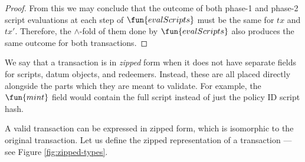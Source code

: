 \begin{property}
\begin{proof}
    From this we may conclude that the outcome of both phase-1 and phase-2 script evaluations
    at each step of $\fun{evalScripts}$ must be the same for $tx$ and $tx'$. Therefore,
    the $\wedge$-fold of them done by $\fun{evalScripts}$ also produces the same outcome
    for both transactions.

\end{proof}
\end{property}

\begin{property}
  \label{prop:zipper}

We say that a transaction is in \emph{zipped} form when it does not have
separate fields for scripts, datum objects, and redeemers. Instead, these are
all placed directly alongside the parts which they are meant to validate.
For example, the $\fun{mint}$ field would contain the full script instead of
just the policy ID script hash.

A valid transaction can be expressed in zipped form, which
is isomorphic to the original transaction. Let us define the zipped representation
of a transaction --- see Figure \ref{fig:zipped-types}.


\end{property}
